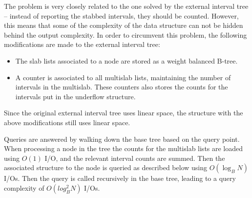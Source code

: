\documentclass[a4paper,12pt]{article}
\begin{document}
The problem is very closely related to the one solved by the external interval tree -- instead of reporting the stabbed intervals, they should be counted. However, this means that some of the complexity of the data structure can not be hidden behind the output complexity. In order to circumvent this problem, the following modifications are made to the external interval tree:
\begin{itemize}
  \item The slab lists associated to a node are stored as a weight balanced B-tree.
  \item A counter is associated to all multislab lists, maintaining the number of intervals in the multislab. These counters also stores the counts for the intervals put in the underflow structure.

\end{itemize}
Since the original external interval tree uses linear space, the structure with the above modifications still uses linear space.

Queries are answered by walking down the base tree based on the query point. When processing a node in the tree the counts for the multislab lists are loaded using $O(1)$ I/O, and the relevant interval counts are summed. Then the associated structure to the node is queried as described below using $O(\log_B N)$ I/Os. Then the query is called recursively in the base tree, leading to a query complexity of $O(log_B^2 N)$ I/Os.
\end{document}
